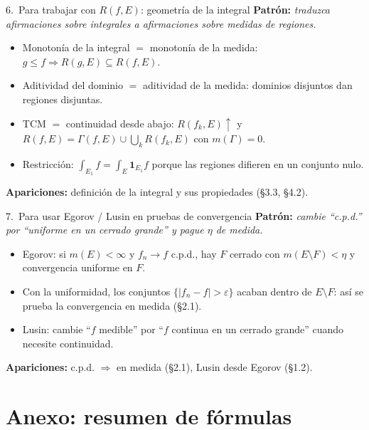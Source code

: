 \documentclass[11pt,twoside]{article}
\newcommand{\ind}{\mathbf{1}}
\begin{document}
\begin{strategybox}{6.\ Para trabajar con $R(f,E)$: geometría de la integral}
\textbf{Patrón:} \textit{traduzca afirmaciones sobre integrales a afirmaciones sobre medidas de regiones.}
\begin{itemize}[leftmargin=1.5em]
\item Monotonía de la integral $=$ monotonía de la medida: $g \leq f \Rightarrow R(g,E) \subseteq R(f,E)$.
\item Aditividad del dominio $=$ aditividad de la medida: dominios disjuntos dan regiones disjuntas.
\item TCM $=$ continuidad desde abajo: $R(f_{k},E) \uparrow$ y $R(f,E) = \Gamma(f,E) \cup \bigcup_{k} R(f_{k},E)$ con $m(\Gamma) = 0$.
\item Restricción: $\int_{E_{1}} f = \int_{E} \ind_{E_{1}} f$ porque las regiones difieren en un conjunto nulo.
\end{itemize}
\textbf{Apariciones:} definición de la integral y sus propiedades (§3.3, §4.2).
\end{strategybox}

\begin{strategybox}{7.\ Para usar Egorov / Lusin en pruebas de convergencia}
\textbf{Patrón:} \textit{cambie ``c.p.d.'' por ``uniforme en un cerrado grande'' y pague $\eta$ de medida.}
\begin{itemize}[leftmargin=1.5em]
\item Egorov: si $m(E) < \infty$ y $f_{n} \to f$ c.p.d., hay $F$ cerrado con $m(E \setminus F) < \eta$ y convergencia uniforme en $F$.
\item Con la uniformidad, los conjuntos $\{|f_{n} - f| > \varepsilon\}$ acaban dentro de $E \setminus F$: así se prueba la convergencia en medida (§2.1).
\item Lusin: cambie ``$f$ medible'' por ``$f$ continua en un cerrado grande'' cuando necesite continuidad.
\end{itemize}
\textbf{Apariciones:} c.p.d. $\Rightarrow$ en medida (§2.1), Lusin desde Egorov (§1.2).
\end{strategybox}

\newpage
\section{Anexo: resumen de fórmulas}
\end{document}
